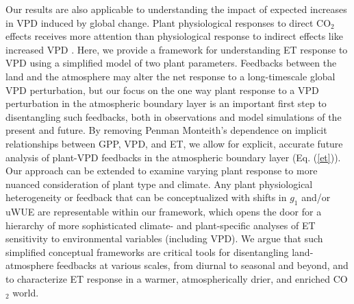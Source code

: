 Our results are also applicable to understanding the impact of
expected increases in VPD induced by global change.  Plant
physiological responses to direct CO$_2$ effects
\citep[e.g.,][]{Swann_2016, Lemordant_2018} receives more attention
than physiological response to indirect effects like increased
VPD \citep{Novick_2016}. Here, we provide a framework for understanding ET response to VPD
using a simplified model of two plant parameters. Feedbacks between the
land and the atmosphere may alter the net response to a long-timescale
global VPD perturbation, but our focus on the one way plant response
to a VPD perturbation in the atmospheric boundary layer is an
important first step to disentangling such feedbacks, both in
observations and model simulations of the present and future. By
removing Penman Monteith's dependence on implicit relationships
between GPP, VPD, and ET, we allow for explicit, accurate future
analysis of plant-VPD feedbacks in the atmospheric boundary layer
(Eq. (\ref{et})). Our approach can be extended to examine varying
plant response to more nuanced consideration of plant type and
climate. Any plant physiological heterogeneity or feedback that can be
conceptualized with shifts in $g_1$ \citep[e.g.][]{Lin_2015,
Medlyn_2017} and/or uWUE \citep[e.g.][]{Zhou_2014} are representable
within our framework, which opens the door for a hierarchy of more
sophisticated climate- and plant-specific analyses of ET sensitivity
to environmental variables (including VPD). We argue that such
simplified conceptual frameworks are critical tools for disentangling
land-atmosphere feedbacks at various scales, from diurnal to seasonal
and beyond, and to characterize ET response in a warmer,
atmospherically drier, and enriched CO$_2$ world.
